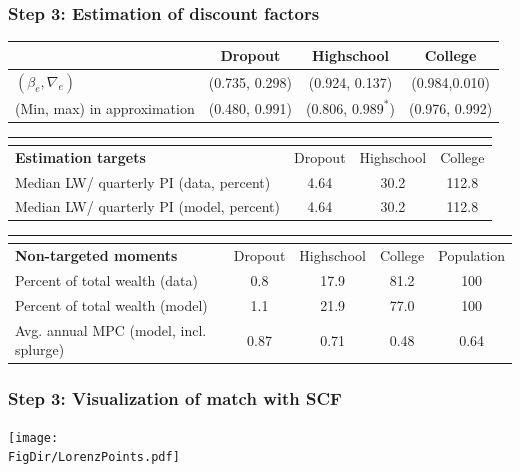 \documentclass[pdflatex,aspectratio=169]{beamer}
\begin{document}
{        \begin{frame}
          \frametitle{Step 3: Estimation of discount factors}
          \begin{tabular}{lccc}
            & Dropout & Highschool & College \\ \midrule
            $(\beta_e, \nabla_e)$ & (0.735, 0.298) & (0.924, 0.137) & (0.984,0.010) \\
            (Min, max) in approximation & (0.480, 0.991) & (0.806, $0.989^*$) & (0.976, 0.992) \\
            \midrule 
          \end{tabular} 
          \begin{tabular}{lccc}
            \multicolumn{4}{l}{ } \\ \midrule
            \textbf{Estimation targets} & Dropout & Highschool & College \\ \midrule
            Median LW/ quarterly PI (data, percent) & 4.64 & 30.2 & 112.8 \\ 
            Median LW/ quarterly PI (model, percent) & 4.64 & 30.2 & 112.8 %
            \\ \midrule 
          \end{tabular} 
          \begin{tabular}{lcccc}
            \multicolumn{5}{l}{ } \\ \midrule
            \textbf{Non-targeted moments} & Dropout & Highschool & College & Population \\ \midrule
            Percent of total wealth (data) & 0.8 & 17.9 & 81.2 & 100 \\
            Percent of total wealth (model) & 1.1 & 21.9 & 77.0 & 100 \\
            Avg. annual MPC (model, incl. splurge) & 0.87 & 0.71 & 0.48 & 0.64
            \\ \bottomrule 
          \end{tabular}
        \end{frame}




        \begin{frame}
          \frametitle{Step 3: Visualization of match with SCF}
          \centering
          \texttt{[image: \\FigDir/LorenzPoints.pdf]}
        \end{frame}


      }{}
\end{document}
